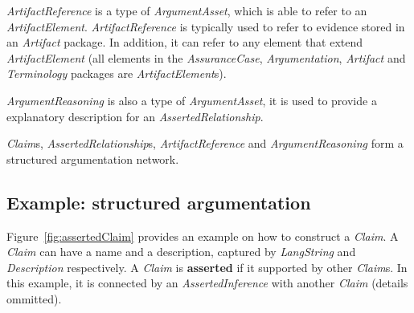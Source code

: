 \textit{ArtifactReference} is a type of \textit{ArgumentAsset}, which is able to refer to an \textit{ArtifactElement}. \textit{ArtifactReference} is typically used to refer to evidence stored in an \textit{Artifact} package. In addition, it can refer to any element that extend \textit{ArtifactElement} (all elements in the \textit{AssuranceCase}, \textit{Argumentation}, \textit{Artifact} and \textit{Terminology} packages are \textit{ArtifactElement}s).

\textit{ArgumentReasoning} is also a type of \textit{ArgumentAsset}, it is used to provide a explanatory description for an \textit{AssertedRelationship}. 

\textit{Claim}s, \textit{AssertedRelationship}s, \textit{ArtifactReference} and \textit{ArgumentReasoning} form a structured argumentation network. 

\subsection{Example: structured argumentation}

Figure~\ref{fig:assertedClaim} provides an example on how to construct a \textit{Claim}. A \textit{Claim} can have a name and a description, captured by \textit{LangString} and \textit{Description} respectively. A \textit{Claim} is \textbf{asserted} if it supported by other \textit{Claim}s. In this example, it is connected by an \textit{AssertedInference} with another \textit{Claim} (details ommitted). 


